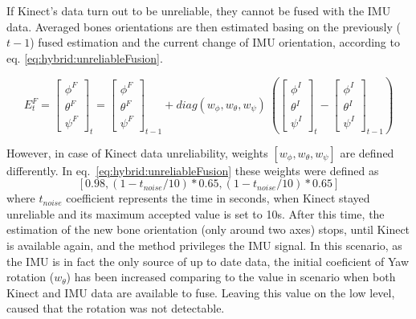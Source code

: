 \documentclass[sensors,article,submit,moreauthors,pdftex,10pt,a4paper]{mdpi}
\begin{document}
If Kinect’s data turn out to be unreliable, they cannot be fused with the IMU data. Averaged bones orientations are then estimated basing on the previously ($t-1$) fused estimation and the current change of IMU orientation, according to eq. \ref{eq:hybrid:unreliableFusion}.
				
\begin{equation} 
	\label{eq:hybrid:unreliableFusion}
	E^F_t = 
	\begin{bmatrix}  \phi^F \\  \theta^F \\  \psi^F \end{bmatrix}_t = 
	\begin{bmatrix}  \phi^F \\  \theta^F \\  \psi^F \end{bmatrix}_{t-1} +
	diag(w_\phi,w_\theta,w_\psi)\
	(\begin{bmatrix}  \phi^I \\  \theta^I \\  \psi^I \end{bmatrix}_t -
	\begin{bmatrix}  \phi^I \\  \theta^I \\  \psi^I \end{bmatrix}_{t-1})
\end{equation}
		
However, in case of Kinect data unreliability, weights $[w_\phi , w_\theta , w_\psi]$ are defined differently. In eq.~\ref{eq:hybrid:unreliableFusion} these weights were defined as $$[0.98,(1-t_{noise}/10)*0.65,(1-t_{noise}/10)*0.65]$$ where $t_{noise}$ coefficient represents the time in seconds, when Kinect stayed unreliable and its maximum accepted value is set to 10s. After this time, the estimation of the new bone orientation (only around two axes) stops, until Kinect is available again, and the method privileges the IMU signal. In this scenario, as the IMU is in fact the only source of up to date data, the initial coeficient of Yaw rotation ($w_\theta$) has been increased comparing to the value in scenario when both Kinect and IMU data are available to fuse. Leaving this value on the low level, caused that the rotation was not detectable. 	
\end{document}
